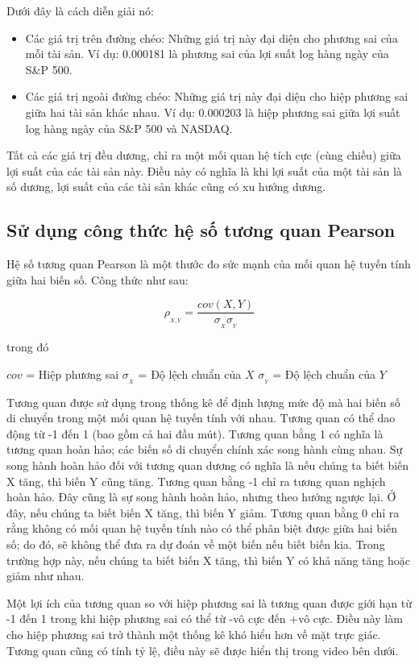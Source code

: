 Dưới đây là cách diễn giải nó:

\begin{itemize}
  \item Các giá trị trên đường chéo: Những giá trị này đại diện cho phương sai của mỗi tài sản. Ví dụ: 0.000181 là phương sai của lợi suất log hàng ngày của S\&P 500.
  \item Các giá trị ngoài đường chéo: Những giá trị này đại diện cho hiệp phương sai giữa hai tài sản khác nhau. Ví dụ: 0.000203 là hiệp phương sai giữa lợi suất log hàng ngày của S\&P 500 và NASDAQ.
\end{itemize}
Tất cả các giá trị đều dương, chỉ ra một mối quan hệ tích cực (cùng chiều) giữa lợi suất của các tài sản này. Điều này có nghĩa là khi lợi suất của một tài sản là số dương, lợi suất của các tài sản khác cũng có xu hướng dương.

\subsection{Sử dụng công thức hệ số tương quan Pearson}

Hệ số tương quan Pearson là một thước đo sức mạnh của mối quan hệ tuyến tính giữa hai biến số. Công thức như sau:

\[\rho_{_{X,Y}} = \frac{cov(X,Y)}{\sigma_{_{X}} \sigma_{_{Y}}}\]

trong đó

$cov$ = Hiệp phương sai $\sigma_{_{X}}$ = Độ lệch chuẩn của $X$ $\sigma_{_{Y}}$ = Độ lệch chuẩn của $Y$

Tương quan được sử dụng trong thống kê để định lượng mức độ mà hai biến số di chuyển trong một mối quan hệ tuyến tính với nhau. Tương quan có thể dao động từ -1 đến 1 (bao gồm cả hai đầu mút). Tương quan bằng 1 có nghĩa là tương quan hoàn hảo; các biến số di chuyển chính xác song hành cùng nhau. Sự song hành hoàn hảo đối với tương quan dương có nghĩa là nếu chúng ta biết biến X tăng, thì biến Y cũng tăng. Tương quan bằng -1 chỉ ra tương quan nghịch hoàn hảo. Đây cũng là sự song hành hoàn hảo, nhưng theo hướng ngược lại. Ở đây, nếu chúng ta biết biến X tăng, thì biến Y giảm. Tương quan bằng 0 chỉ ra rằng không có mối quan hệ tuyến tính nào có thể phân biệt được giữa hai biến số; do đó, sẽ không thể đưa ra dự đoán về một biến nếu biết biến kia. Trong trường hợp này, nếu chúng ta biết biến X tăng, thì biến Y có khả năng tăng hoặc giảm như nhau.

Một lợi ích của tương quan so với hiệp phương sai là tương quan được giới hạn từ -1 đến 1 trong khi hiệp phương sai có thể từ -vô cực đến +vô cực. Điều này làm cho hiệp phương sai trở thành một thống kê khó hiểu hơn về mặt trực giác. Tương quan cũng có tính tỷ lệ, điều này sẽ được hiển thị trong video bên dưới.

